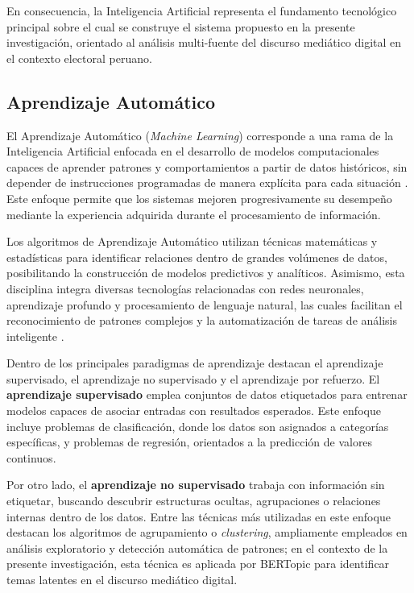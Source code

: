 En consecuencia, la Inteligencia Artificial representa el fundamento tecnológico principal sobre el cual se construye el sistema propuesto en la presente investigación, orientado al análisis multi-fuente del discurso mediático digital en el contexto electoral peruano.

\subsection{Aprendizaje Automático}

El Aprendizaje Automático (\textit{Machine Learning}) corresponde a una rama de la Inteligencia Artificial enfocada en el desarrollo de modelos computacionales capaces de aprender patrones y comportamientos a partir de datos históricos, sin depender de instrucciones programadas de manera explícita para cada situación \parencite{bk_russell2009intart}. Este enfoque permite que los sistemas mejoren progresivamente su desempeño mediante la experiencia adquirida durante el procesamiento de información.

Los algoritmos de Aprendizaje Automático utilizan técnicas matemáticas y estadísticas para identificar relaciones dentro de grandes volúmenes de datos, posibilitando la construcción de modelos predictivos y analíticos. Asimismo, esta disciplina integra diversas tecnologías relacionadas con redes neuronales, aprendizaje profundo y procesamiento de lenguaje natural, las cuales facilitan el reconocimiento de patrones complejos y la automatización de tareas de análisis inteligente \parencite{bk_alpaydin2014ml}.

Dentro de los principales paradigmas de aprendizaje destacan el aprendizaje supervisado, el aprendizaje no supervisado y el aprendizaje por refuerzo. El \textbf{aprendizaje supervisado} emplea conjuntos de datos etiquetados para entrenar modelos capaces de asociar entradas con resultados esperados. Este enfoque incluye problemas de clasificación, donde los datos son asignados a categorías específicas, y problemas de regresión, orientados a la predicción de valores continuos.

Por otro lado, el \textbf{aprendizaje no supervisado} trabaja con información sin etiquetar, buscando descubrir estructuras ocultas, agrupaciones o relaciones internas dentro de los datos. Entre las técnicas más utilizadas en este enfoque destacan los algoritmos de agrupamiento o \textit{clustering}, ampliamente empleados en análisis exploratorio y detección automática de patrones; en el contexto de la presente investigación, esta técnica es aplicada por BERTopic para identificar temas latentes en el discurso mediático digital.

